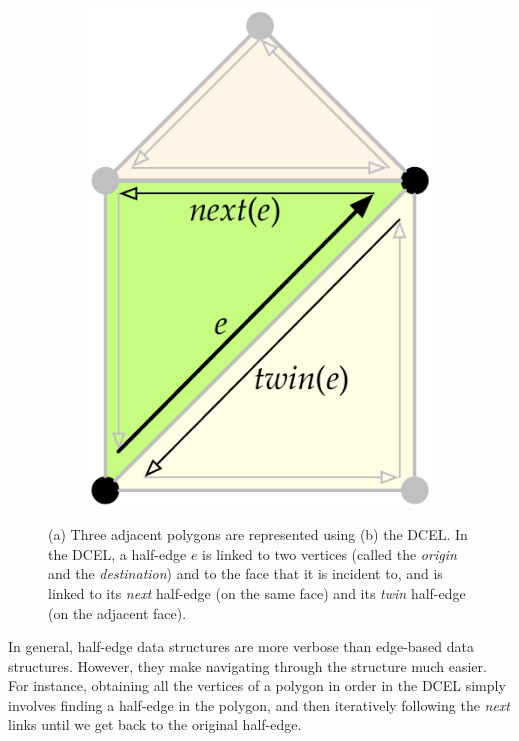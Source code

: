 \begin{figure}
\begin{subfigure}[b]{0.27\linewidth}
\includegraphics[width=\linewidth]{figs/halfedge-2}
\caption{}%
\label{subfig:halfedge-2}
\end{subfigure}
\caption{(a) Three adjacent polygons are represented using (b) the DCEL\@.
In the DCEL, a half-edge \(e\) is linked to two vertices (called the \emph{origin} and the \emph{destination}) and to the face that it is incident to, and is linked to its \emph{next} half-edge (on the same face) and its \emph{twin} half-edge (on the adjacent face).}%
\label{fig:halfedge}
\end{figure}

In general, half-edge data structures are more verbose than edge-based data structures.
However, they make navigating through the structure much easier.
For instance, obtaining all the vertices of a polygon in order in the DCEL simply involves finding a half-edge in the polygon, and then iteratively following the \emph{next} links until we get back to the original half-edge.

